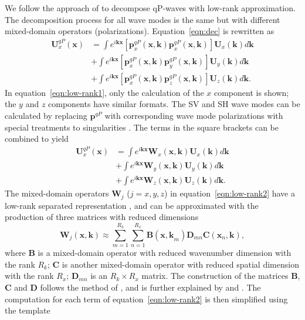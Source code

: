\documentclass[manuscript,ulem,graphix,revised]{geophysics}
\begin{document}
We follow the approach of \citet{cheng14} to decompose qP-waves with low-rank approximation.
The decomposition process for all wave modes is the same but with different mixed-domain operators (polarizations).
Equation~\ref{eqn:dec} is rewritten as
\begin{equation}
\begin{split}
\mathbf{U}^{qP}_x(\mathbf{x})&=\int e^{i\mathbf{kx}}[\mathbf{p}^{qP}_{x}(\mathbf{x,k})\mathbf{p}^{qP}_{x}(\mathbf{x,k})]\mathbf{U}_x(\mathbf{k})d\mathbf{k}\\
                    &+\int e^{i\mathbf{kx}}[\mathbf{p}^{qP}_{x}(\mathbf{x,k})\mathbf{p}^{qP}_{y}(\mathbf{x,k})]\mathbf{U}_y(\mathbf{k})d\mathbf{k} \\
                    &+\int e^{i\mathbf{kx}}[\mathbf{p}^{qP}_{x}(\mathbf{x,k})\mathbf{p}^{qP}_{z}(\mathbf{x,k})]\mathbf{U}_z(\mathbf{k})d\mathbf{k}. 
\end{split}
\label{eqn:low-rank1}
\end{equation}
In equation~\ref{eqn:low-rank1}, only the calculation of the $x$ component is shown; the $y$ and $z$ components have similar formats. The SV and SH wave modes can be calculated by replacing $\mathbf{p}^{qP}$ with corresponding wave mode polarizations with special treatments to singularities 
\citep{cheng14,Sripanich16}. 
The terms in the square brackets can be combined to yield
\begin{equation}
\begin{split}
\mathbf{U}^{qP}_x(\mathbf{x})&=\int e^{i\mathbf{kx}}\mathbf{W}_x(\mathbf{x,k})\mathbf{U}_x(\mathbf{k})d\mathbf{k} \\
                    &+\int e^{i\mathbf{kx}}\mathbf{W}_y(\mathbf{x,k})\mathbf{U}_y(\mathbf{k})d\mathbf{k}\\
                    &+\int e^{i\mathbf{kx}}\mathbf{W}_z(\mathbf{x,k})\mathbf{U}_z(\mathbf{k})d\mathbf{k}. 
\end{split}
\label{eqn:low-rank2}
\end{equation}
The mixed-domain operators $\mathbf{W}_j$ ($j=x,y,z$) in equation~\ref{eqn:low-rank2} have a low-rank separated representation \citep{fomel13}, and can be approximated with the production of three matrices with reduced dimensions 
\begin{equation}
\mathbf{W}_j(\mathbf{x,k})\approx \sum^{R_k}_{m=1}\sum^{R_x}_{n=1}\mathbf{B}(\mathbf{x,k}_{m})\mathbf{D}_{m n}\mathbf{C}(\mathbf{x}_{n},\mathbf{k}), 
\label{eqn:low-rank3}
\end{equation}
where $\mathbf{B}$ is a mixed-domain operator with reduced wavenumber dimension with the rank $R_k$; $\mathbf{C}$ is another mixed-domain operator with reduced spatial dimension with the rank $R_x$; $\mathbf{D}_{m n}$ is an $R_k \times R_x$ matrix. The construction of the matrices $\mathbf{B}$, $\mathbf{C}$ and $\mathbf{D}$ follows the method of \citet{engquist09}, and is further explained by \citet{fomel13} and \citet{cheng14}. The computation for each term of equation~\ref{eqn:low-rank2} is then simplified using the template
\end{document}

